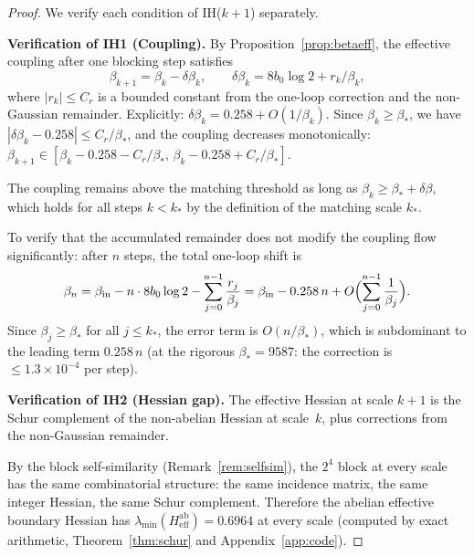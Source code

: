 \documentclass[11pt]{article}
\theoremstyle{definition}
\begin{document}
\begin{proof}
We verify each condition of IH($k+1$) separately.

\medskip\noindent\textbf{Verification of IH1 (Coupling).}
By Proposition~\ref{prop:betaeff}, the effective coupling after one
blocking step satisfies
\begin{equation}
\beta_{k+1}=\beta_k-\delta\beta_k,\qquad
\delta\beta_k=8b_0\log 2+r_k/\beta_k,
\end{equation}
where $|r_k|\le C_r$ is a bounded constant from the one-loop
correction and the non-Gaussian remainder.  Explicitly:
$\delta\beta_k=0.258+O(1/\beta_k)$.  Since $\beta_k\ge\beta_*$, we have
$|\delta\beta_k-0.258|\le C_r/\beta_*$, and the coupling decreases
monotonically: $\beta_{k+1}\in[\beta_k-0.258-C_r/\beta_*,\,\beta_k-0.258+C_r/\beta_*]$.

The coupling remains above the matching threshold as long as
$\beta_k\ge\beta_*+\delta\beta$, which holds for all steps $k<k_*$ by
the definition of the matching scale $k_*$.

To verify that the accumulated remainder does not modify the coupling
flow significantly: after $n$ steps, the total one-loop shift is
\begin{equation}
\beta_n=\beta_{\mathrm{in}}-n\cdot 8b_0\log 2
-\sum_{j=0}^{n-1}\frac{r_j}{\beta_j}
=\beta_{\mathrm{in}}-0.258\,n+O\Bigl(\sum_{j=0}^{n-1}\frac{1}{\beta_j}\Bigr).
\end{equation}
Since $\beta_j\ge\beta_*$ for all $j\le k_*$, the error term is
$O(n/\beta_*)$, which is subdominant to the leading term $0.258\,n$
(at the rigorous $\beta_*=9587$: the correction is
$\le 1.3\times 10^{-4}$ per step).

\medskip\noindent\textbf{Verification of IH2 (Hessian gap).}
The effective Hessian at scale $k+1$ is the Schur complement of the
non-abelian Hessian at scale~$k$, plus corrections from the
non-Gaussian remainder.

By the block self-similarity (Remark~\ref{rem:selfsim}), the
$2^4$ block at every scale has the same combinatorial structure:
the same incidence matrix, the same integer Hessian, the same
Schur complement.  Therefore the abelian effective boundary
Hessian has $\lambda_{\min}(H_{\mathrm{eff}}^{\mathrm{ab}})=0.6964$
at every scale (computed by exact arithmetic,
Theorem~\ref{thm:schur} and Appendix~\ref{app:code}).


\end{proof}
\end{document}
